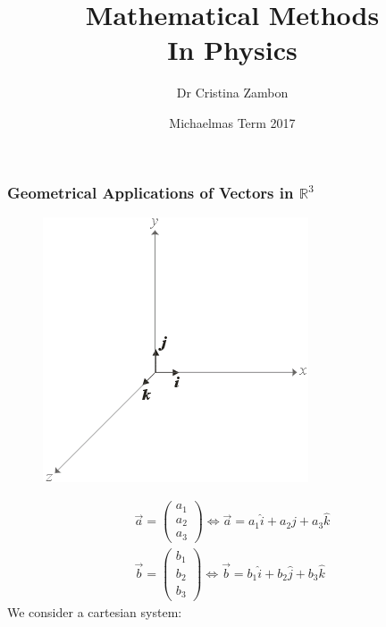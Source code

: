 \documentclass[a4paper, 11pt, normalem]{report}
\title{Mathematical Methods \\ In Physics \vspace{-20pt}}
\author{Dr Cristina Zambon}
\date{\vspace{-15pt}Michaelmas Term 2017}
\newcommand\R{\mathbb{R}}
\begin{document}
\maketitle
\tableofcontents

\part{}
\chapter{}
\section{Geometrical Applications of Vectors in $\R^3$}
\begin{figure}
    \begin{center}
        \includegraphics[scale=0.5]{Cart.png}
    \end{center}
\end{figure}
\begin{gather*}
    \vec{a} =
    \begin{pmatrix}
        a_1 \\
        a_2 \\
        a_3
    \end{pmatrix}
    \iff
    \vec{a} = a_{1}\hat{i} + a_{2}\hat{j} + a_{3}\hat{k} \\
    \vec{b} =
    \begin{pmatrix}
        b_1 \\
        b_2 \\
        b_3
    \end{pmatrix}
    \iff
    \vec{b} = b_{1}\hat{i} + b_{2}\hat{j} + b_{3}\hat{k}
\end{gather*}
We consider a cartesian system:
\end{document}
